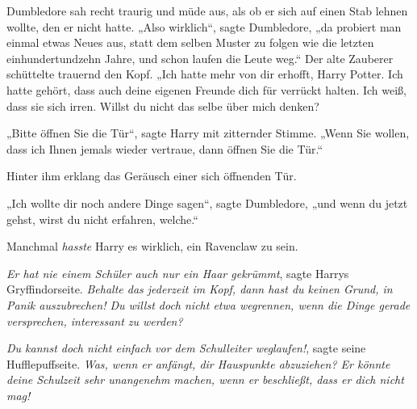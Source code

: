 Dumbledore sah recht traurig und müde aus, als ob er sich auf einen Stab lehnen wollte, den er nicht hatte.
„Also wirklich“, sagte Dumbledore, „da probiert man einmal etwas Neues aus, statt dem selben Muster zu folgen wie die letzten einhundertundzehn Jahre, und schon laufen die Leute weg.“ Der alte Zauberer schüttelte trauernd den Kopf. „Ich hatte mehr von dir erhofft, Harry Potter. Ich hatte gehört, dass auch deine eigenen Freunde dich für verrückt halten. Ich weiß, dass sie sich irren. Willst du nicht das selbe über mich denken?

„Bitte öffnen Sie die Tür“, sagte Harry mit zitternder Stimme. „Wenn Sie wollen, dass ich Ihnen jemals wieder vertraue, dann öffnen Sie die Tür.“

Hinter ihm erklang das Geräusch einer sich öffnenden Tür.

„Ich wollte dir noch andere Dinge sagen“, sagte Dumbledore, „und wenn du jetzt gehst, wirst du nicht erfahren, welche.“

Manchmal \emph{hasste} Harry es wirklich, ein Ravenclaw zu sein.

\emph{Er hat nie einem Schüler auch nur ein Haar gekrümmt}, sagte Harrys Gryffindorseite. \emph{Behalte das jederzeit im Kopf, dann hast du keinen Grund, in Panik auszubrechen! Du willst doch nicht etwa wegrennen, wenn die Dinge gerade versprechen, interessant zu werden?}

\emph{Du kannst doch nicht einfach vor dem Schulleiter weglaufen!}, sagte seine Hufflepuffseite. \emph{Was, wenn er anfängt, dir Hauspunkte abzuziehen? Er könnte deine Schulzeit sehr unangenehm machen, wenn er beschließt, dass er dich nicht mag!}

